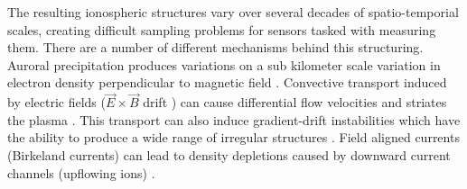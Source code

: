 %
%
%
%

The resulting ionospheric structures vary over several decades of spatio-temporial scales, creating difficult sampling problems for sensors tasked with measuring them. There are a number of different mechanisms behind this structuring. Auroral precipitation produces variations on a sub kilometer scale variation in electron density perpendicular to magnetic field \citep{Semeter:2005fo}. Convective transport induced by electric fields ($\vec{E}\times\vec{B}$ drift \citep{chen1984introduction}) can cause differential flow velocities and striates the plasma \citep{Tsunoda:1988ul}. This transport can also induce gradient-drift instabilities which have the ability to produce a wide range of irregular structures \citep{GRL:GRL52468}. Field aligned currents (Birkeland currents) can lead to density depletions caused by downward current channels (upflowing ions) \citep{Perry:2015jf}.

